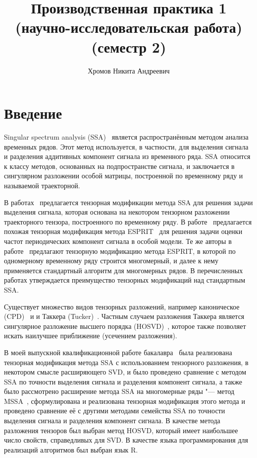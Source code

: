 \documentclass[specialist,
  substylefile=spbu_report.rtx,
subf,href,colorlinks=true, 12pt]{disser}
\theoremstyle{plain}
\theoremstyle{definition}
\theoremstyle{remark}
\begin{document}
\title{Производственная практика 1 (научно-исследовательская работа)
(семестр 2)}
\author{Хромов Никита Андреевич}
\date{\number\year}
\maketitle

\tableofcontents

\section{Введение}\label{sec:intro}
Singular spectrum analysis (SSA)~\cite{ssa} является
распространённым методом анализа временных рядов.
Этот метод используется, в частности, для выделения сигнала и
разделения аддитивных компонент сигнала из
временного ряда.
SSA относится к классу методов, основанных на подпространстве
сигнала, и заключается в сингулярном разложении
особой матрицы, построенной по временному ряду и называемой траекторной.

В работах~\cite{TSSA, TSSA-improved} предлагается тензорная
модификации метода SSA для решения
задачи выделения сигнала, которая основана на некотором тензорном
разложении траекторного тензора,
построенного по временному ряду.
В работе~\cite{hosvd-hooi-separation} предлагается похожая
тензорная модификация
метода ESPRIT~\cite{esprit} для решения задачи оценки частот
периодических компонент сигнала
в особой модели.
Те же авторы в работе~\cite{Papy2009} предлагают тензорную модификацию метода
ESPRIT, в которой по одномерному временному ряду строится многомерный, и
далее к нему применяется стандартный алгоритм для многомерных рядов.
В перечисленных работах утверждается преимущество тензорных
модификаций над стандартным SSA\@.

Существует множество видов тензорных разложений, например
каноническое \linebreak (CPD)~\cite{parafac1, parafac2} и
и Таккера (Tucker)~\cite{tucker}. Частным случаем разложения
Таккера является сингулярное
разложение высшего порядка (HOSVD)~\cite{hosvd}, которое также
позволяет искать наилучшее приближение
(усечением разложения).

В моей выпускной квалификационной работе бакалавра~\cite{Thesis2024} была
реализована тензорная модификация
метода SSA с использованием тензорного разложения, в некотором
смысле расширяющего SVD,
и было проведено сравнение с методом SSA по точности выделения
сигнала и разделения
компонент сигнала, а также было рассмотрено
расширение метода SSA на многомерные ряды "--- метод
MSSA~\cite{ssa-2020},
сформулирована и реализована тензорная модификация этого метода и
проведено сравнение её с другими методами
семейства SSA по точности выделения сигнала и разделения компонент сигнала.
В качестве метода разложения тензоров был выбран метод HOSVD, который имеет
наибольшее число
свойств, справедливых для SVD.
В качестве языка программирования для реализаций алгоритмов был выбран язык R.
\end{document}
